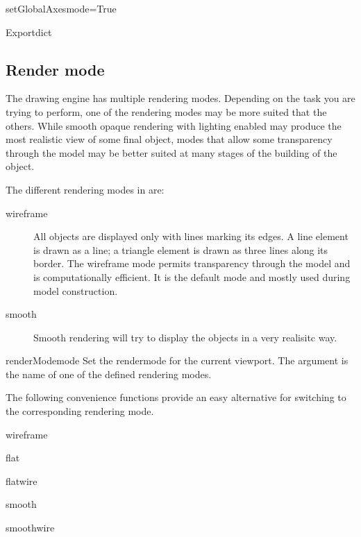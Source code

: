 \begin{funcdesc}{setGlobalAxes}{mode=True}
\end{funcdesc}

\begin{funcdesc}{Export}{dict}
\end{funcdesc}


\subsection{Render mode}

The \pyformex drawing engine has multiple rendering modes. Depending on the task you are trying to perform, one of the rendering modes may be more suited that the others. While smooth opaque rendering with lighting enabled may produce the most realistic view of some final object, modes that allow some transparency through the model may be better suited at many stages of the building of the object.

The different rendering modes in \pyformex are:
\begin{description}
  \item[wireframe] All objects are displayed only with lines marking its edges. A line element is drawn as a line; a triangle element is drawn as three lines along its border. The wireframe mode permits transparency through the model and is computationally efficient. It is the default mode and mostly used during model construction.
  \item[smooth] Smooth rendering will try to display the objects in a very realisitc way. 
\end{description}


\begin{funcdesc}{renderMode}{mode}
Set the rendermode for the current viewport. The argument is the name of one of the defined rendering modes.
\end{funcdesc}

The following convenience functions provide an easy alternative for switching to the corresponding rendering mode.
    
\begin{funcdesc}{wireframe}{}
\end{funcdesc}
\begin{funcdesc}{flat}{}
\end{funcdesc}
\begin{funcdesc}{flatwire}{}
\end{funcdesc}
\begin{funcdesc}{smooth}{}
\end{funcdesc}
\begin{funcdesc}{smoothwire}{}
\end{funcdesc}


